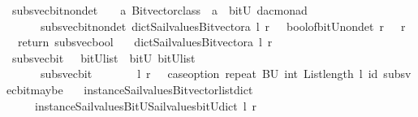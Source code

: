 \begin{isabellebody}
\ subs{\isacharunderscore}vec{\isacharunderscore}bit{\isacharunderscore}nondet\ \ {\isacharcolon}{\isacharcolon}\ {\isachardoublequoteopen}\ {\isacharprime}a\ Bitvector{\isacharunderscore}class\ {\isasymRightarrow}\ {\isacharprime}a\ {\isasymRightarrow}\ bitU\ {\isasymRightarrow}{\isacharparenleft}{\isacharprime}d{\isacharcomma}{\isacharprime}a{\isacharcomma}{\isacharprime}c{\isacharparenright}monad\ {\isachardoublequoteclose}\ \ \ \isanewline
\ \ \ \ \ {\isachardoublequoteopen}\ subs{\isacharunderscore}vec{\isacharunderscore}bit{\isacharunderscore}nondet\ dict{\isacharunderscore}Sail{}{\isacharunderscore}values{\isacharunderscore}Bitvector{\isacharunderscore}a\ l\ r\ {\isacharequal}\ {\isacharparenleft}\ bool{\isacharunderscore}of{\isacharunderscore}bitU{\isacharunderscore}nondet\ r\ {\isasymbind}\ {\isacharparenleft}{\isasymlambda}\ r\ {\isachardot}\ \ return\ {\isacharparenleft}subs{\isacharunderscore}vec{\isacharunderscore}bool\ \isanewline
\ \ dict{\isacharunderscore}Sail{}{\isacharunderscore}values{\isacharunderscore}Bitvector{\isacharunderscore}a\ l\ r{\isacharparenright}{\isacharparenright}{\isacharparenright}{\isachardoublequoteclose}\isanewline
\isanewline
{}\isamarkupfalse%
\ subs{\isacharunderscore}vec{\isacharunderscore}bit\ \ {\isacharcolon}{\isacharcolon}\ {\isachardoublequoteopen}{\isacharparenleft}bitU{\isacharparenright}list\ {\isasymRightarrow}\ bitU\ {\isasymRightarrow}{\isacharparenleft}bitU{\isacharparenright}list\ {\isachardoublequoteclose}\ \ \ \isanewline
\ \ \ \ \ {\isachardoublequoteopen}\ subs{\isacharunderscore}vec{\isacharunderscore}bit\ \ \ \ \ \ \ \ l\ r\ {\isacharequal}\ {\isacharparenleft}\ case{\isacharunderscore}option\ {\isacharparenleft}repeat\ {\isacharbrackleft}BU{\isacharbrackright}\ {\isacharparenleft}int\ {\isacharparenleft}List{\isachardot}length\ l{\isacharparenright}{\isacharparenright}{\isacharparenright}\ id\ {\isacharparenleft}subs{\isacharunderscore}vec{\isacharunderscore}bit{\isacharunderscore}maybe\ \isanewline
\ \ {\isacharparenleft}instance{\isacharunderscore}Sail{}{\isacharunderscore}values{\isacharunderscore}Bitvector{\isacharunderscore}list{\isacharunderscore}dict\isanewline
\ \ \ \ \ instance{\isacharunderscore}Sail{}{\isacharunderscore}values{\isacharunderscore}BitU{\isacharunderscore}Sail{}{\isacharunderscore}values{\isacharunderscore}bitU{\isacharunderscore}dict{\isacharparenright}\ l\ r{\isacharparenright}{\isacharparenright}{\isachardoublequoteclose}\isanewline
\isanewline
\isanewline

\end{isabellebody}
